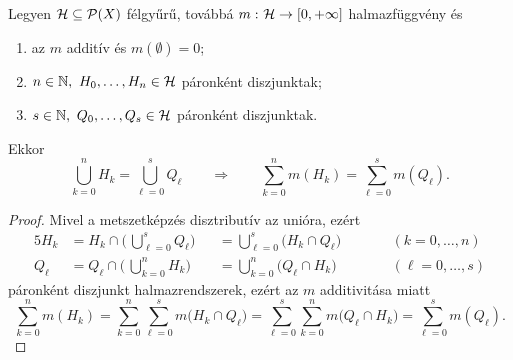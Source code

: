 \documentclass[
]{elteikthesis}[2024/04/26]
\begin{document}
	\begin{theorem}{}{}
		Legyen \( \mathcal{H} \subseteq \mathcal{P}( X ) \) félgyűrű, 
		továbbá \( m \,\colon \mathcal{H} \to [0, +\infty] \) halmazfüggvény és
		\begin{enumerate}
			\item az \( m \) additív és \( m(\emptyset) = 0 \);
			\item \( n \in \mathbb{N}, \ H_0, \dots, H_n \in \mathcal{H} \) páronként diszjunktak;
			\item \( s \in \mathbb{N}, \ Q_0, \dots, Q_s \in \mathcal{H} \) páronként diszjunktak.
		\end{enumerate}
		Ekkor
		\[
			\bigcup_{k=0}^n \! H_k = \bigcup_{\ell=0}^s Q_\ell
			\qquad \Longrightarrow \qquad
			\sum_{k=0}^{n} m( H_k ) = \sum_{\ell=0}^{s} m( Q_\ell ).
		\]
	\end{theorem}
	\begin{proof}
		Mivel a metszetképzés disztributív az unióra, ezért
		\begin{alignat*}{5}
			H_k &= 
			H_k \cap \Biggl( \, \bigcup_{\ell=0}^s Q_\ell \Biggr) &&=
			\bigcup_{\ell=0}^s \bigl( H_k \cap Q_\ell \bigr) \qquad &&(k=0,\dots,n) \\[6pt]
			Q_\ell &= 
			Q_\ell \cap \Biggl( \, \bigcup_{k=0}^n H_k \Biggr) &&=
			\bigcup_{k=0}^n \bigl( Q_\ell \cap H_k \bigr) &&(\ell=0,\dots,s)
		\end{alignat*}
		páronként diszjunkt halmazrendszerek, ezért az \( m \) additivitása miatt
		\[
			\sum_{k=0}^n m( H_k ) =
			\sum_{k=0}^n \sum_{\ell=0}^s m \bigl( H_k \cap Q_\ell \bigr) =
			\sum_{\ell=0}^s \sum_{k=0}^n  m \bigl( Q_\ell \cap H_k \bigr) =
			\sum_{\ell=0}^s m( Q_\ell ).
		\]
	\end{proof}
	
\end{document}
